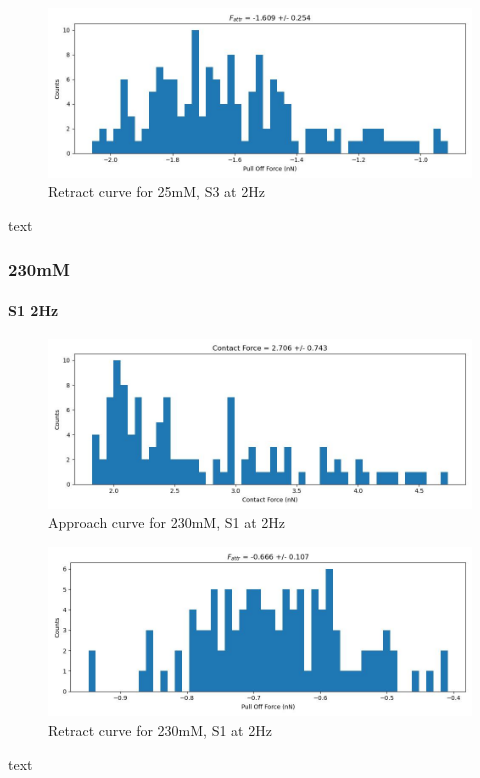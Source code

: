 \begin{figure}[h!]
\centering
\includegraphics[width=\textwidth]{chapter7/Tip speed/25mM/S3 2Hz/retract_f_a_hist.jpg}
\caption{Retract curve for 25mM, S3 at 2Hz}
\end{figure}
text
\newpage

\subsubsection*{230mM}
\paragraph{S1 2Hz}
\begin{figure}[h!]
\centering
\includegraphics[width=\textwidth]{chapter7/Tip speed/230mM/S1 2Hz/approach_f_c_hist.jpg}
\caption{Approach curve for 230mM, S1 at 2Hz}
\end{figure}

\begin{figure}[h!]
\centering
\includegraphics[width=\textwidth]{chapter7/Tip speed/230mM/S1 2Hz/retract_f_a_hist.jpg}
\caption{Retract curve for 230mM, S1 at 2Hz}
\end{figure}
text
\newpage

